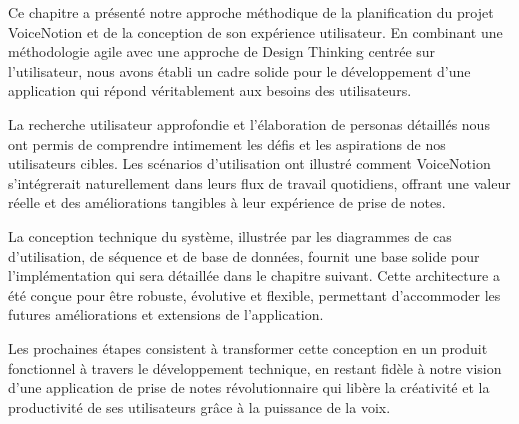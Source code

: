 Ce chapitre a présenté notre approche méthodique de la planification du projet VoiceNotion et de la conception de son expérience utilisateur. En combinant une méthodologie agile avec une approche de Design Thinking centrée sur l'utilisateur, nous avons établi un cadre solide pour le développement d'une application qui répond véritablement aux besoins des utilisateurs.

La recherche utilisateur approfondie et l'élaboration de personas détaillés nous ont permis de comprendre intimement les défis et les aspirations de nos utilisateurs cibles. Les scénarios d'utilisation ont illustré comment VoiceNotion s'intégrerait naturellement dans leurs flux de travail quotidiens, offrant une valeur réelle et des améliorations tangibles à leur expérience de prise de notes.

La conception technique du système, illustrée par les diagrammes de cas d'utilisation, de séquence et de base de données, fournit une base solide pour l'implémentation qui sera détaillée dans le chapitre suivant. Cette architecture a été conçue pour être robuste, évolutive et flexible, permettant d'accommoder les futures améliorations et extensions de l'application.

Les prochaines étapes consistent à transformer cette conception en un produit fonctionnel à travers le développement technique, en restant fidèle à notre vision d'une application de prise de notes révolutionnaire qui libère la créativité et la productivité de ses utilisateurs grâce à la puissance de la voix. 
